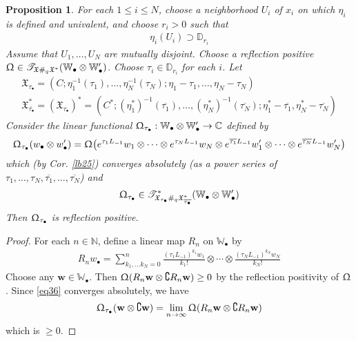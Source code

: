 \documentclass[11pt,b5paper,notitlepage]{article}
\theoremstyle{definition}
\theoremstyle{plain}
\newtheorem{pp}[df]{Proposition}
\newcommand{\fk}{\mathfrak}
\newcommand{\ovl}{\overline}
\newcommand{\scr}{\mathscr}
\newcommand{\Co}{\complement}
\newcommand{\blt}{\bullet}
\newcommand{\Wbb}{\mathbb W}
\newcommand{\Cbb}{\mathbb C}
\newcommand{\Nbb}{\mathbb N}
\newcommand{\Dbb}{\mathbb D}
\newcommand{\wbf}{\mathbf w}
\numberwithin{equation}{section}
\begin{document}
\begin{pp}\label{lb44}
For each $1\leq i\leq N$, choose a neighborhood $U_i$ of $x_i$ on which $\eta_i$ is defined and univalent, and choose $r_i>0$ such that
\begin{align*}
\eta_i(U_i)\supset\Dbb_{r_i}
\end{align*} 
Assume that $U_1,\dots,U_N$ are mutually disjoint. Choose a reflection positive $\Upomega\in\scr T_{\fk X\#_q\fk X^*}(\Wbb_\blt\otimes\Wbb_\blt')$. Choose $\tau_i\in\Dbb_{r_i}$ for each $i$. Let
\begin{gather*}
\fk X_{\tau_\blt}=(C;\eta_1^{-1}(\tau_1),\dots,\eta_N^{-1}(\tau_N);\eta_1-\tau_1,\dots,\eta_N-\tau_N)\\
\fk X_{\ovl{\tau_\blt}}^*=(\fk X_{\tau_\blt})^*=(C^*;(\eta_1^*)^{-1}(\ovl{\tau_1}),\dots,(\eta_N^*)^{-1}(\ovl{\tau_N});\eta_1^*-\ovl{\tau_1},\eta_N^*-\ovl{\tau_N})
\end{gather*}
Consider the linear functional $\Upomega_{\tau_\blt}:\Wbb_\blt\otimes\Wbb_\blt'\rightarrow\Cbb$ defined by
\begin{align}  \label{eq36}
\Upomega_{\tau_\blt}(w_\blt\otimes w'_\blt)=\Upomega\big(e^{\tau_1 L_{-1}}w_1\otimes\cdots\otimes e^{\tau_NL_{-1}}w_N\otimes e^{\ovl {\tau_1} L_{-1}}w_1'\otimes\cdots\otimes e^{\ovl {\tau_N}L_{-1}}w_N' \big)
\end{align}
which (by Cor. \ref{lb25}) converges absolutely (as a power series of $\tau_1,\dots,\tau_N,\ovl{\tau_1},\dots,\ovl{\tau_N}$) and
\begin{align*}
\Upomega_{\tau_\blt}\in\scr T_{\fk X_{\tau_\blt}\#_q \fk X^*_{\ovl{\tau_\blt}}}^*(\Wbb_\blt\otimes\Wbb_\blt')
\end{align*}
Then $\Upomega_{\tau_\blt}$ is reflection positive.
\end{pp}

\begin{proof}
For each $n\in\Nbb$, define a linear map $R_n$ on $\Wbb_\blt$ by
\begin{align*}
R_n w_\blt=\sum_{k_1,\dots k_N=0}^n\frac{(\tau_1L_{-1})^{k_1}w_1}{k_1!}\otimes\cdots\otimes \frac{(\tau_NL_{-1})^{k_N}w_N}{k_N!}
\end{align*}
Choose any $\wbf\in\Wbb_\blt$. Then $\Upomega(R_n\wbf\otimes \Co R_n\wbf)\geq 0$ by the reflection positivity of $\Upomega$. Since \eqref{eq36} converges absolutely, we have
\begin{align*}
\Upomega_{\tau_\blt}(\wbf\otimes\Co\wbf)=\lim_{n\rightarrow\infty}\Upomega(R_n\wbf\otimes \Co R_n\wbf)
\end{align*}
which is $\geq 0$.
\end{proof}
\end{document}
